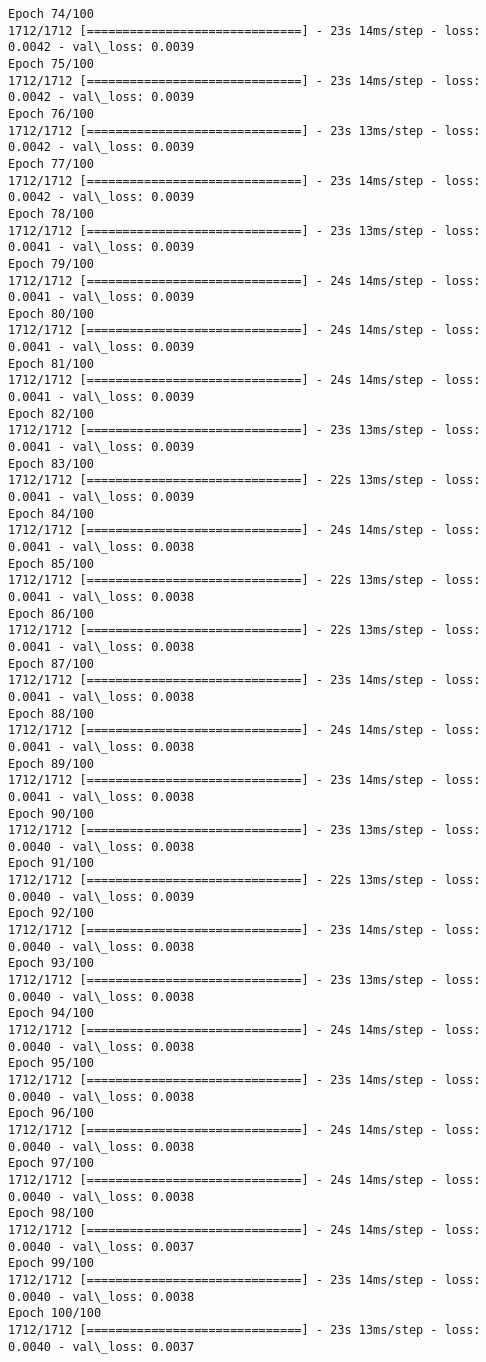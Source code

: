\documentclass[11pt]{article}
\begin{document}
\begin{Verbatim}[commandchars=\\\{\}]
Epoch 74/100
1712/1712 [==============================] - 23s 14ms/step - loss: 0.0042 - val\_loss: 0.0039
Epoch 75/100
1712/1712 [==============================] - 23s 14ms/step - loss: 0.0042 - val\_loss: 0.0039
Epoch 76/100
1712/1712 [==============================] - 23s 13ms/step - loss: 0.0042 - val\_loss: 0.0039
Epoch 77/100
1712/1712 [==============================] - 23s 14ms/step - loss: 0.0042 - val\_loss: 0.0039
Epoch 78/100
1712/1712 [==============================] - 23s 13ms/step - loss: 0.0041 - val\_loss: 0.0039
Epoch 79/100
1712/1712 [==============================] - 24s 14ms/step - loss: 0.0041 - val\_loss: 0.0039
Epoch 80/100
1712/1712 [==============================] - 24s 14ms/step - loss: 0.0041 - val\_loss: 0.0039
Epoch 81/100
1712/1712 [==============================] - 24s 14ms/step - loss: 0.0041 - val\_loss: 0.0039
Epoch 82/100
1712/1712 [==============================] - 23s 13ms/step - loss: 0.0041 - val\_loss: 0.0039
Epoch 83/100
1712/1712 [==============================] - 22s 13ms/step - loss: 0.0041 - val\_loss: 0.0039
Epoch 84/100
1712/1712 [==============================] - 24s 14ms/step - loss: 0.0041 - val\_loss: 0.0038
Epoch 85/100
1712/1712 [==============================] - 22s 13ms/step - loss: 0.0041 - val\_loss: 0.0038
Epoch 86/100
1712/1712 [==============================] - 22s 13ms/step - loss: 0.0041 - val\_loss: 0.0038
Epoch 87/100
1712/1712 [==============================] - 23s 14ms/step - loss: 0.0041 - val\_loss: 0.0038
Epoch 88/100
1712/1712 [==============================] - 24s 14ms/step - loss: 0.0041 - val\_loss: 0.0038
Epoch 89/100
1712/1712 [==============================] - 23s 14ms/step - loss: 0.0041 - val\_loss: 0.0038
Epoch 90/100
1712/1712 [==============================] - 23s 13ms/step - loss: 0.0040 - val\_loss: 0.0038
Epoch 91/100
1712/1712 [==============================] - 22s 13ms/step - loss: 0.0040 - val\_loss: 0.0039
Epoch 92/100
1712/1712 [==============================] - 23s 14ms/step - loss: 0.0040 - val\_loss: 0.0038
Epoch 93/100
1712/1712 [==============================] - 23s 13ms/step - loss: 0.0040 - val\_loss: 0.0038
Epoch 94/100
1712/1712 [==============================] - 24s 14ms/step - loss: 0.0040 - val\_loss: 0.0038
Epoch 95/100
1712/1712 [==============================] - 23s 14ms/step - loss: 0.0040 - val\_loss: 0.0038
Epoch 96/100
1712/1712 [==============================] - 24s 14ms/step - loss: 0.0040 - val\_loss: 0.0038
Epoch 97/100
1712/1712 [==============================] - 24s 14ms/step - loss: 0.0040 - val\_loss: 0.0038
Epoch 98/100
1712/1712 [==============================] - 24s 14ms/step - loss: 0.0040 - val\_loss: 0.0037
Epoch 99/100
1712/1712 [==============================] - 23s 14ms/step - loss: 0.0040 - val\_loss: 0.0038
Epoch 100/100
1712/1712 [==============================] - 23s 13ms/step - loss: 0.0040 - val\_loss: 0.0037

    \end{Verbatim}
\end{document}
